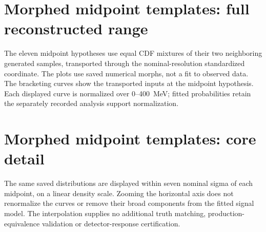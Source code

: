 \clearpage
\section{Morphed midpoint templates: full reconstructed range}
The eleven midpoint hypotheses use equal CDF mixtures of their two
neighboring generated samples, transported through the nominal-resolution
standardized coordinate. The plots use saved numerical morphs, not a fit
to observed data. The bracketing curves show the transported inputs at
the midpoint hypothesis. Each displayed curve is normalized over
0--400~MeV; fitted probabilities retain the separately recorded analysis
support normalization.


\clearpage
\section{Morphed midpoint templates: core detail}
The same saved distributions are displayed within seven nominal sigma
of each midpoint, on a linear density scale. Zooming the horizontal
axis does not renormalize the curves or remove their broad components
from the fitted signal model. The interpolation supplies no additional
truth matching, production-equivalence validation or detector-response
certification.


